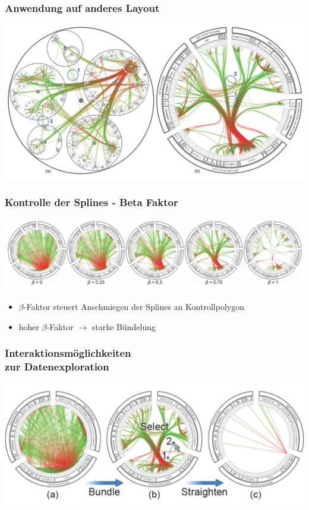 \documentclass[11pt]{beamer}
\begin{document}
\begin{frame}
\frametitle{Anwendung auf anderes Layout}
\includegraphics[scale=0.35]{./Algorithm_Result_OtherLayout.png}
\end{frame}

\begin{frame}
\frametitle{Kontrolle der Splines - Beta Faktor}
\includegraphics[scale=0.35]{./Algorithm_BetaFactor_Results.png}
\begin{itemize}
\bigskip
\item $\beta$-Faktor steuert Anschmiegen der Splines an Kontrollpolygon
\item hoher $\beta$-Faktor $\rightarrow$ starke Bündelung
\end{itemize}
\end{frame}

\begin{frame}
\frametitle{Interaktionsmöglichkeiten\\ zur Datenexploration}
\includegraphics[scale=0.30]{./Algorithm_Interaction.png}
\end{frame}
\end{document}
